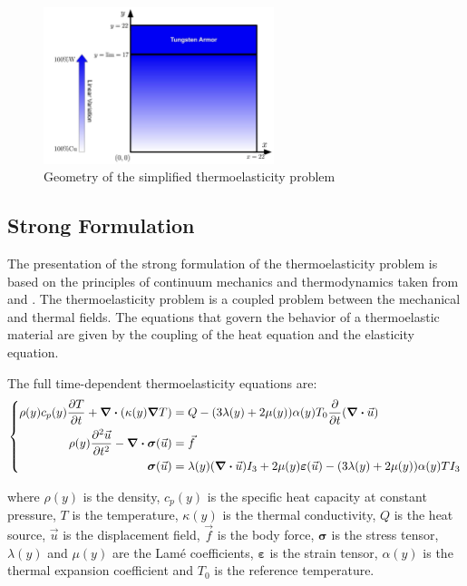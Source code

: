 \documentclass[a4paper,12pt,twoside]{report}
\begin{document}
\begin{figure}[!h]
	\centering
	\includegraphics[width=0.6\textwidth]{figures/geometry_thermoelasticity_simplified.jpg}
	\caption{Geometry of the simplified thermoelasticity problem}
	\label{fig:geometry_thermoelasticity_simplified}
\end{figure}

\subsection{Strong Formulation}
The presentation of the strong formulation of the thermoelasticity problem is based on the principles of continuum mechanics and thermodynamics taken from \cite{MeyerSpringer2015} and \cite{Persson2016}. The thermoelasticity problem is a coupled problem between the mechanical and thermal fields. The equations that govern the behavior of a thermoelastic material are given by the coupling of the heat equation and the elasticity equation.

The full time-dependent thermoelasticity equations are:
\begin{equation}
	\left\{
	\begin{aligned}
		\rho(y) c_p(y) \frac{\partial T}{\partial t} + \div (\kappa(y) \grad T) &= Q - (3\lambda(y) + 2\mu(y))\alpha(y) T_0 \frac{\partial}{\partial t} (\div \vec u) \\
		\rho(y) \frac{\partial^2 \vec u}{\partial t^2} - \div \boldsymbol{\sigma}(\vec u) &= \vec f  \\
		\boldsymbol{\sigma}(\vec u) &= \lambda(y) (\div \vec u) I_3 + 2\mu(y) \boldsymbol{\varepsilon}(\vec u) - (3\lambda(y) + 2\mu(y)) \alpha(y) T I_3 
	\end{aligned}
	\right.
\end{equation}

where $\rho(y)$ is the density, $c_p(y)$ is the specific heat capacity at constant pressure, $T$ is the temperature, $\kappa(y)$ is the thermal conductivity, $Q$ is the heat source, $\vec u$ is the displacement field, $\vec f$ is the body force, $\boldsymbol{\sigma}$ is the stress tensor, $\lambda(y)$ and $\mu(y)$ are the Lamé coefficients, $\boldsymbol{\varepsilon}$ is the strain tensor, $\alpha(y)$ is the thermal expansion coefficient and $T_0$ is the reference temperature.
\end{document}
